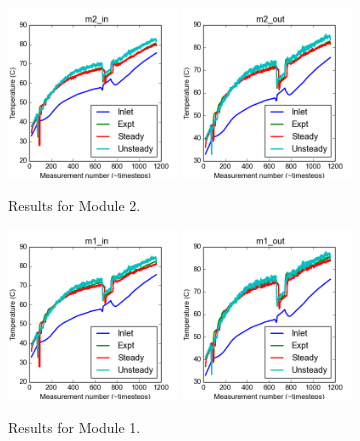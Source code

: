 \documentclass{article}
\begin{document}
\clearpage
\begin{figure}[!ht]
\centering
\includegraphics[width=0.4\textwidth]{../../data/ICSolar/images/Jan28_m2_in_compare.png}\hspace{0.05\textwidth}
\includegraphics[width=0.4\textwidth]{../../data/ICSolar/images/Jan28_m2_out_compare.png}\hspace{0.05\textwidth}\\
\caption{Results for Module 2.}\end{figure}
\begin{figure}[!ht]
\centering
\includegraphics[width=0.4\textwidth]{../../data/ICSolar/images/Jan28_m1_in_compare.png}\hspace{0.05\textwidth}
\includegraphics[width=0.4\textwidth]{../../data/ICSolar/images/Jan28_m1_out_compare.png}\hspace{0.05\textwidth}\\
\caption{Results for Module 1.}\end{figure}
\end{document}
